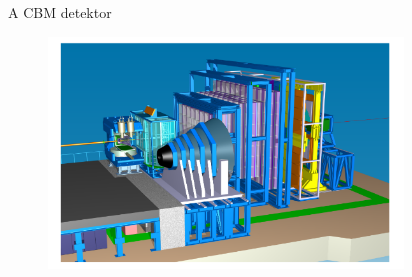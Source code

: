 \documentclass[10pt]{beamer}
\begin{document}
\begin{frame}[t]{A CBM detektor}
\begin{figure}[H!]
\centering
\includegraphics[width=0.84\textwidth]{../latex/cbm_detector.png}
\end{figure}
\end{frame}
\end{document}
